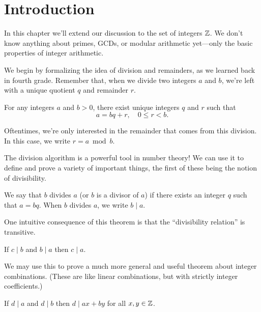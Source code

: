 \documentclass[../m55main.tex]{subfiles}
\begin{document}
\section{Introduction}
In this chapter we'll extend our discussion to the set of integers $\mathbb{Z}$.
We don't know anything about primes, GCDs, or modular arithmetic yet---only the basic properties of integer arithmetic.

We begin by formalizing the idea of division and remainders, as we learned back in fourth grade.
Remember that, when we divide two integers $a$ and $b$, we're left with a unique quotient $q$ and remainder $r$.

\begin{theorem}
    For any integers $a$ and $b > 0$, there exist unique integers $q$ and $r$ such that
    \[ a = bq + r, \quad 0 \leq r < b. \]
\end{theorem}


Oftentimes, we're only interested in the remainder that comes from this division.
In this case, we write $r = a \bmod b$.

The division algorithm is a powerful tool in number theory!
We can use it to define and prove a variety of important things, the first of these being the notion of divisibility.

\begin{definition}[Divisibility]
    We say that $b$ divides $a$ (or $b$ is a divisor of $a$) if there exists an integer $q$ such that $a = bq$.
    When $b$ divides $a$, we write $b \mid a$.
\end{definition}

One intuitive consequence of this theorem is that the ``divisibility relation'' is transitive.

\begin{theorem}
    If $c \mid b$ and $b \mid a$ then $c \mid a$.
\end{theorem}


We may use this to prove a much more general and useful theorem about integer combinations.
(These are like linear combinations, but with strictly integer coefficients.)

\begin{theorem}
    If $d \mid a$ and $d \mid b$ then $d \mid ax + by$ for all $x,y \in \mathbb{Z}$.
\end{theorem}
\end{document}
